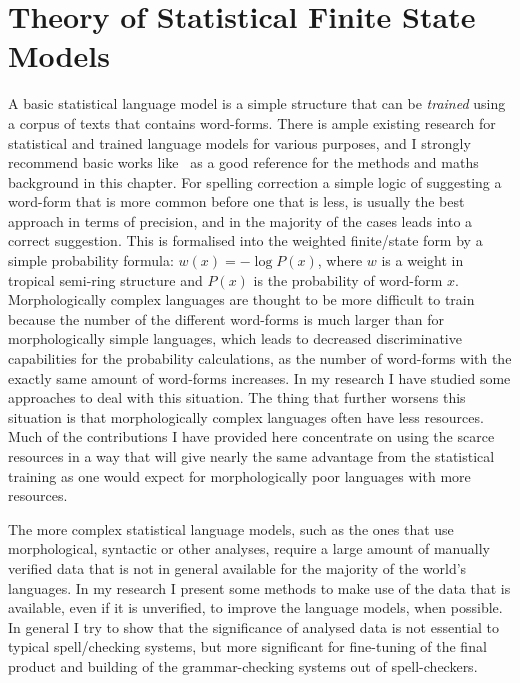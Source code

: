 \documentclass[officiallayout]{unihelcompling}
\begin{document}
\section{Theory of Statistical Finite State Models}
\label{sec:statistical}

A basic statistical language model is a simple structure that can be
\emph{trained} using a corpus of texts that contains word-forms. There is ample
existing research for statistical and trained language models for various
purposes, and I strongly recommend basic works
like~\citet{manning1999foundations} as a good reference for the methods and
maths background in this chapter.  For spelling correction a simple logic of
suggesting a word-form that is more common before one that is less, is usually
the best approach in terms of precision, and in the majority of the cases leads
into a correct suggestion. This is formalised into the weighted finite\-/state
form by a simple probability formula: $w(x) = -\log P(x)$, where $w$ is a
weight in tropical semi-ring structure and $P(x)$ is the probability of
word-form $x$.  Morphologically complex languages are thought to be more
difficult to train because the number of the different word-forms is much
larger than for morphologically simple languages, which leads to decreased
discriminative capabilities for the probability calculations, as the number of
word-forms with the exactly same amount of word-forms increases. In my research
I have studied some approaches to deal with this situation. The thing that
further worsens this situation is that morphologically complex languages often
have less resources.  Much of the contributions I have provided here
concentrate on using the scarce resources in a way that will give nearly the
same advantage from the statistical training as one would expect for
morphologically poor languages with more resources.

The more complex statistical language models, such as the ones that use
morphological, syntactic or other analyses, require a large amount of manually
verified data that is not in general available for the majority of the world's
languages. In my research I present some methods to make use of the data that
is available, even if it is unverified, to improve the language models, when
possible. In general I try to show that the significance of analysed data is
not essential to typical spell\-/checking systems, but more significant for
fine-tuning of the final product and building of the grammar-checking systems
out of spell-checkers.
\end{document}
